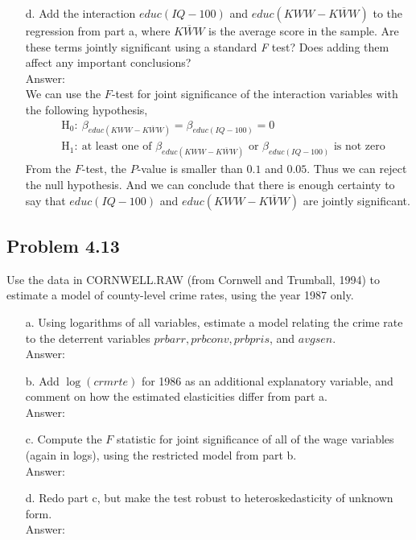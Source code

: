 \documentclass[10pt]{article}
\begin{document}
\begin{enumerate}
\item[d.] Add the interaction $educ(IQ-100)$ and $educ(KWW-\overline{KWW})$ to the regression from part a, where $\overline{KWW}$ is the average score in the sample. Are these terms jointly significant using a standard \textit{F} test? Does adding them affect any important conclusions?
\\ Answer:\\


We can use the $F$-test for joint significance of the interaction variables with the following hypothesis,
\begin{align*}
    &\text{H}_0:\ \beta_{educ(KWW-\overline{KWW})}=\beta_{educ(IQ-100)}=0\\
    &\text{H}_1:\ \text{at least one of }\beta_{educ(KWW-\overline{KWW})}\text{ or }\beta_{educ(IQ-100)} \text{ is not zero}
\end{align*}
From the $F$-test, the $P$-value is smaller than $0.1$ and $0.05$. Thus we can reject the null hypothesis. And we can conclude that there is enough certainty to say that $educ(IQ-100)$ and $educ(KWW-\overline{KWW})$ are jointly significant.
\end{enumerate}


\subsection*{Problem 4.13}
Use the data in CORNWELL.RAW (from Cornwell and Trumball, 1994) to estimate a model of county-level crime rates, using the year 1987 only.
\begin{enumerate}
\item[a.] Using logarithms of all variables, estimate a model relating the crime rate to the deterrent variables $prbarr, prbconv, prbpris$, and $avgsen.$
\\ Answer:\\


\item[b.] Add $\log(crmrte)$ for 1986 as an additional explanatory variable, and comment on how the estimated elasticities differ from part a.
\\ Answer:\\


\item[c.] Compute the $F$ statistic for joint significance of all of the wage variables (again in logs), using the restricted model from part b.
\\ Answer:\\


\item[d.] Redo part c, but make the test robust to heteroskedasticity of unknown form.
\\ Answer:\\

\end{enumerate}
\end{document}
